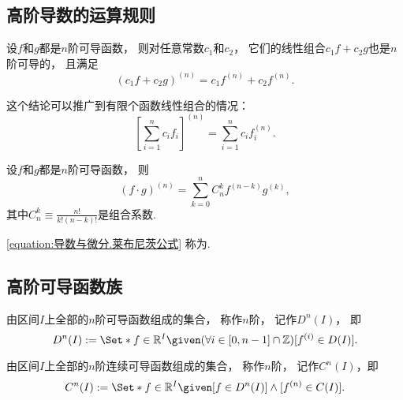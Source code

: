 \subsection{高阶导数的运算规则}
\begin{theorem}
设\(f\)和\(g\)都是\(n\)阶可导函数，
则对任意常数\(c_1\)和\(c_2\)，
它们的线性组合\(c_1 f + c_2 g\)也是\(n\)阶可导的，
且满足\begin{equation}
	(c_1 f + c_2 g)^{(n)}
	= c_1 f^{(n)} + c_2 f^{(n)}.
\end{equation}
\end{theorem}

这个结论可以推广到有限个函数线性组合的情况：\begin{equation}
	\left[ \sum_{i=1}^n c_i f_i \right]^{(n)}
	= \sum_{i=1}^n c_i f_i^{(n)}.
\end{equation}

\begin{theorem}
设\(f\)和\(g\)都是\(n\)阶可导函数，
则\begin{equation}\label{equation:导数与微分.莱布尼茨公式}
	(f \cdot g)^{(n)}
	= \sum_{k=0}^n C_n^k f^{(n-k)} g^{(k)},
\end{equation}
其中\(C_n^k \equiv \frac{n!}{k! (n-k)!}\)是组合系数.
\end{theorem}
\cref{equation:导数与微分.莱布尼茨公式} 称为.

\subsection{高阶可导函数族}
\begin{definition}\label{definition:函数族.n阶可导函数族}
由区间\(I\)上全部的\(n\)阶可导函数组成的集合，
称作\(n\)阶，
记作\(D^n(I)\)，
即\[
	D^n(I)
	\defeq
	\Set*{
		f\in\mathbb{R}^I
		\given
		(\forall i\in[0,n-1]\cap\mathbb{Z})
		[f^{(i)} \in D(I)]
	}.
\]
\end{definition}

\begin{definition}\label{definition:函数族.n阶连续可导函数族}
由区间\(I\)上全部的\(n\)阶连续可导函数组成的集合，
称作\(n\)阶，
记作\(C^n(I)\)，即\[
	C^n(I)
	\defeq
	\Set*{
		f\in\mathbb{R}^I
		\given
		[f\in D^n(I)]
		\land
		[f^{(n)}\in C(I)]
	}.
\]
\end{definition}

